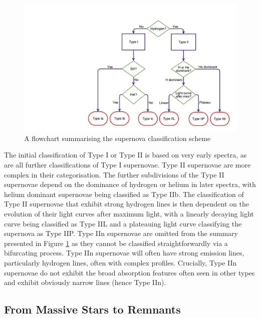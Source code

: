 \begin{figure}
\centering
\includegraphics[clip=true, scale = 0.2, trim= 930 50 55 210]{chapters/chapter1/figs/sn_classification.png}
\caption{A flowchart summarising the supernova classification scheme}
\label{intro:fig:sn_class}
\end{figure}


The initial classification of Type I or Type II is based on very early spectra, as are all further classifications of Type I supernovae.  Type II supernovae are more complex in their categorisation.  The further subdivisions of the Type II supernovae depend on the dominance of hydrogen or helium in later spectra, with helium dominant supernovae being classified as Type IIb.  The classification of Type II supernovae that exhibit strong hydrogen lines is then dependent on the evolution of their light curves after maximum light, with a linearly decaying light curve being classified as Type IIL and a plateauing light curve classifying the supernova as Type IIP.  Type IIn supernovae are omitted from the summary presented in Figure \ref{intro:fig:sn_class} as they cannot be classified straightforwardly via a bifurcating process.  Type IIn supernovae will often have strong emission lines, particularly hydrogen lines, often with complex profiles.  Crucially, Type IIn supernovae do not exhibit the broad absorption features often seen in other types and exhibit obviously narrow lines (hence Type IIn).  

\subsection{From Massive Stars to Remnants}

